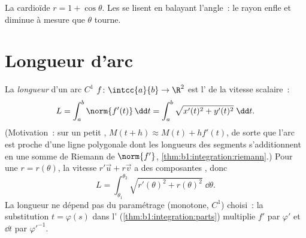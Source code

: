 \begin{omfigure}

{\small La cardioïde $r = 1 + \cos\theta$. Les  se
lisent en balayant l'angle~: le rayon enfle et diminue à mesure que
$\theta$ tourne.}
\end{omfigure}

\section{Longueur d'arc}

\begin{definition}\label{def:b1:curves:arclength}
La \emph{longueur} d'un arc $C^1$ $f \colon
\intcc{a}{b} \to \R^2$ est l' de la vitesse scalaire~:
\[
L = \int_a^b \norm{f'(t)}\,\dd t
= \int_a^b \sqrt{x'(t)^2 + y'(t)^2}\;\dd t .
\]
(Motivation~: sur un petit , $M(t + h) \approx M(t) + h
f'(t)$, de sorte que l'arc est proche d'une ligne polygonale dont les
longueurs des segments s'additionnent en une somme de Riemann de
$\norm{f'}$, \cref{thm:b1:integration:riemann}.) Pour une  $r = r(\theta)$, la vitesse $r'\vec u + r\vec v$ a des
composantes , donc
\[
L = \int_{\theta_1}^{\theta_2}
\sqrt{r'(\theta)^2 + r(\theta)^2}\;\dd\theta .
\]
La longueur ne dépend pas du paramétrage (monotone, $C^1$)
choisi~: la substitution $t = \varphi(s)$ dans l'
(\cref{thm:b1:integration:parts}) multiplie $f'$ par
$\varphi'$ et $\dd t$ par $\varphi'^{-1}$.
\end{definition}


